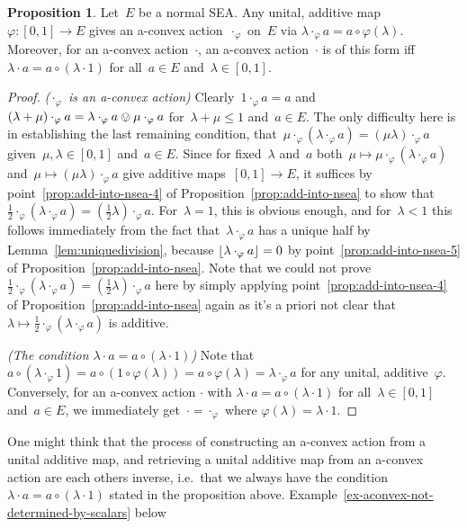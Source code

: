 \documentclass[a4paper, onecolumn, accepted=2020-12-22]{quantumarticle}
\DeclarePairedDelimiter{\floor}{\lfloor}{\rfloor}
\newcommand{\mult}{\mathop{\circ}}
\newcounter{counter}
\theoremstyle{definition}
\newtheorem{proposition}[counter]{Proposition}
\begin{document}
\begin{proposition}
\label{prop:a-convex-from-phi}
Let~$E$ be a normal SEA.
Any unital, additive map $\varphi\colon [0,1]\to E$
gives an a-convex action~$\cdot_\varphi$
on~$E$ via $\lambda\cdot_\varphi a = a\mult \varphi(\lambda)$.
Moreover,
for an a-convex action~$\cdot$, 
an a-convex action~$\cdot$
is of this form iff
  $\lambda \cdot a = a\mult (\lambda\cdot 1)$
  for all~$a\in E$ and~$\lambda\in [0,1]$.
\end{proposition}
\begin{proof}
\emph{($\cdot_\varphi$ is an a-convex action)}
    Clearly~$1 \cdot_\varphi a = a$
        and~$(\lambda + \mu)\cdot_\varphi a 
        = \lambda \cdot_\varphi a \ovee \mu \cdot_\varphi a$
            for~$\lambda + \mu \leq 1$ and~$a\in E$.
The only difficulty here is in establishing the last remaining
  condition, that~$\mu \cdot_\varphi (\lambda \cdot_\varphi a) =
    (\mu\lambda)\cdot_\varphi a$
    given~$\mu,\lambda\in[0,1]$ and~$a\in E$.
  Since for fixed~$\lambda$ and~$a$ 
  both~$\mu \mapsto \mu \cdot_\varphi (\lambda \cdot_\varphi a)$
and~$\mu \mapsto (\mu \lambda) \cdot_\varphi a$
give additive maps~$[0,1] \to E$,
it suffices 
by point~\ref{prop:add-into-nsea-4} of Proposition~\ref{prop:add-into-nsea}
to show
  that~$\frac12 \cdot_\varphi (\lambda \cdot_\varphi a) 
  = (\frac12 \lambda) \cdot_\varphi a$.
For~$\lambda=1$, this is obvious enough,
and for~$\lambda<1$
this follows immediately from the fact that~$\lambda\cdot_\varphi a$
has a unique half
by Lemma~\ref{lem:uniquedivision},
because $\floor{\lambda \cdot_\varphi a} =0$
by point~\ref{prop:add-into-nsea-5} of Proposition~\ref{prop:add-into-nsea}.
Note that we could not 
  prove~$\frac12 \cdot_\varphi (\lambda \cdot_\varphi a) 
  = (\frac12 \lambda) \cdot_\varphi a$
  here
  by simply
  applying point~\ref{prop:add-into-nsea-4} of
  Proposition~\ref{prop:add-into-nsea} again
  as it's a priori not clear that 
  $\lambda \mapsto \frac12\cdot_\varphi(\lambda\cdot_\varphi a)$ is additive.

\emph{(The condition $\lambda \cdot a = a \mult (\lambda \cdot 1)$)}
  Note that~$a\mult (\lambda\cdot_\varphi 1)
  = a\mult (1\mult \varphi(\lambda)) = a\mult \varphi(\lambda)=
  \lambda\cdot_\varphi a$ for any unital, additive~$\varphi$.
  Conversely, for an a-convex action $\cdot$ 
with $\lambda\cdot a = a\mult(\lambda \cdot 1)$
  for all~$\lambda\in[0,1]$ and~$a\in E$,
  we immediately get~$\cdot = \cdot_\varphi$ where
  $\varphi(\lambda)=\lambda\cdot 1$.
\end{proof}
One might think that the process of constructing an a-convex action from a unital additive map, and retrieving a unital additive map from an a-convex action are each others inverse, i.e.~that we always have the condition $\lambda\cdot a = a\mult(\lambda\cdot 1)$ stated in the proposition above. Example~\ref{ex-aconvex-not-determined-by-scalars} below
\end{document}
